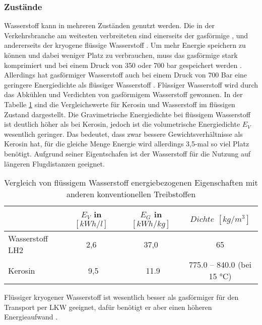 \subsubsection{Zustände}
Wasserstoff kann in mehreren Zuständen genutzt werden. Die in der Verkehrsbranche am weitesten verbreiteten
sind einerseits der gasförmige , und andererseits der kryogene flüssige Wasserstoff . 
Um mehr Energie speichern zu können und dabei weniger Platz zu verbrauchen, muss das gasförmige  stark komprimiert und 
bei einem Druck von 350 oder 700 bar gespeichert werden \cite{colpan2022fuel}.
Allerdings hat gasförmiger Wasserstoff auch bei einem Druck von 700 Bar eine geringere Energiedichte
als flüssiger Wasserstoff \cite{eichlseder2012hydrogen}.
Flüssiger Wasserstoff wird durch das Abkühlen und Verdichten von gasförmigem Wasserstoff gewonnen.
In der Tabelle \ref{wasserstoff_energie} sind die Vergleichswerte für Kerosin und Wasserstoff im flüssigen Zustand dargestellt.
Die Gravimetrische Energiedichte bei flüssigem Wasserstoff ist deutlich höher als bei Kerosin, 
jedoch ist die volumetrische Energiedichte $E_V$ wesentlich geringer.
Das bedeutet, dass  zwar bessere Gewichtsverhältnisse als Kerosin hat, 
für die gleiche Menge Energie wird allerdings 3,5-mal so viel Platz benötigt.
Aufgrund seiner Eigentschafen ist der Wasserstoff für die Nutzung auf längeren Flugdistanzen geeignet.
\begin{table}[h]
	\begin{center}
    \caption{Vergleich von flüssigem Wasserstoff energiebezogenen Eigenschaften mit anderen konventionellen Treibstoffen}
	\label{wasserstoff_energie}
	\begin{tabular}{|l|c|c|c|}
		\hline
		& \textbf{$E_V$ in $[kWh/l]$} & \textbf{$E_G$ in $[kWh/kg]$} & \textbf{$Dichte$ $[kg/m^3]$}  \\ \hline
		Wasserstoff LH2 \cite{colpan2022fuel} & 2,6 & 37,0 & 65 \\ \hline
		Kerosin \cite{colpan2022fuel} & ~9,5 & ~11.9 &  775.0 – 840.0 (bei 15 °C) \\ \hline %
	\end{tabular}
    \end{center}
\end{table}
%
Flüssiger kryogener Wasserstoff ist wesentlich besser als gasförmiger für den Transport per LKW geeignet,
dafür benötigt er aber einen höheren Energieaufwand \cite{colpan2022fuel}. 


